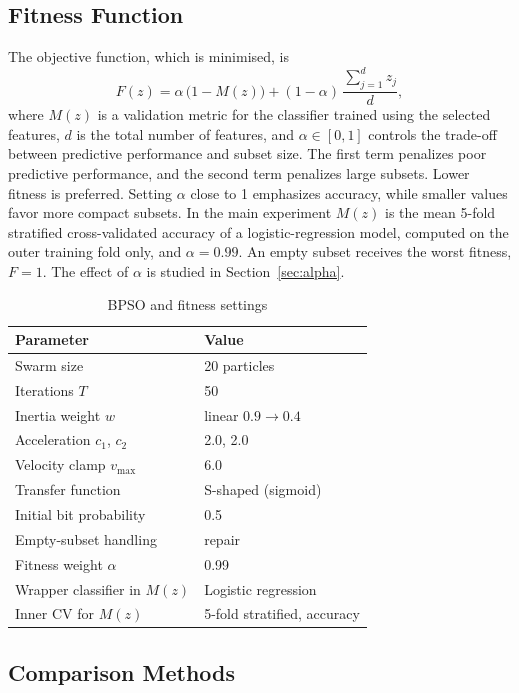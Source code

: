 \documentclass[conference]{IEEEtran}
\begin{document}
\subsection{Fitness Function}

The objective function, which is minimised, is
\begin{equation}
F(z) = \alpha\,\bigl(1 - M(z)\bigr) + (1-\alpha)\,\frac{\sum_{j=1}^{d} z_j}{d},
\label{eq:fitness}
\end{equation}
where $M(z)$ is a validation metric for the classifier trained using the
selected features, $d$ is the total number of features, and
$\alpha \in [0,1]$ controls the trade-off between predictive performance and
subset size. The first term penalizes poor predictive performance, and the
second term penalizes large subsets. Lower fitness is preferred. Setting
$\alpha$ close to 1 emphasizes accuracy, while smaller values favor more
compact subsets. In the main experiment $M(z)$ is the mean 5-fold stratified
cross-validated accuracy of a logistic-regression model, computed on the
outer training fold only, and $\alpha = 0.99$. An empty subset receives the
worst fitness, $F = 1$. The effect of $\alpha$ is studied in
Section~\ref{sec:alpha}.

\begin{table}[!t]
\centering
\caption{BPSO and fitness settings}
\label{tab:bpso}
\footnotesize
\begin{tabular}{ll}
\toprule
\textbf{Parameter} & \textbf{Value} \\
\midrule
Swarm size & 20 particles \\
Iterations $T$ & 50 \\
Inertia weight $w$ & linear $0.9 \rightarrow 0.4$ \\
Acceleration $c_1$, $c_2$ & 2.0, 2.0 \\
Velocity clamp $v_{\max}$ & 6.0 \\
Transfer function & S-shaped (sigmoid) \\
Initial bit probability & 0.5 \\
Empty-subset handling & repair \\
Fitness weight $\alpha$ & 0.99 \\
Wrapper classifier in $M(z)$ & Logistic regression \\
Inner CV for $M(z)$ & 5-fold stratified, accuracy \\
\bottomrule
\end{tabular}
\end{table}

\subsection{Comparison Methods}
\end{document}

